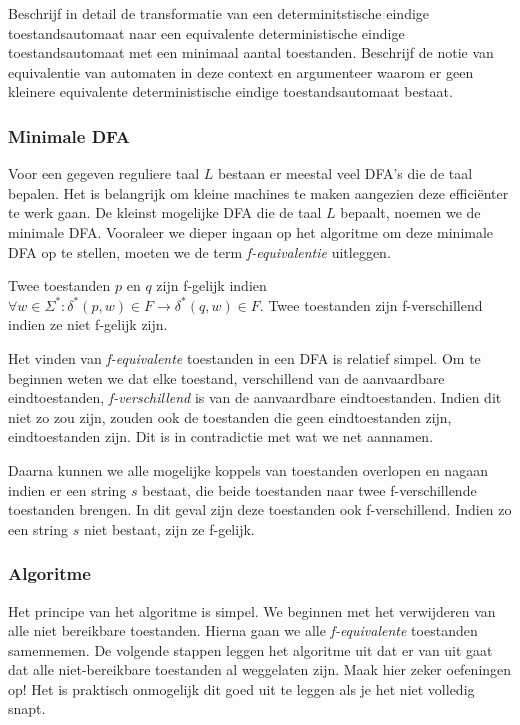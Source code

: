 \begin{question}
Beschrijf in detail de transformatie van een determinitstische eindige toestandsautomaat naar een equivalente deterministische eindige toestandsautomaat met een minimaal aantal toestanden. Beschrijf de notie van equivalentie van automaten in deze context en argumenteer waarom er geen kleinere equivalente deterministische eindige toestandsautomaat bestaat.
\end{question}

\subsubsection*{Minimale DFA}

Voor een gegeven reguliere taal $L$ bestaan er meestal veel DFA's die de taal bepalen. Het is belangrijk om kleine machines te maken aangezien deze effici\"enter te werk gaan. De kleinst mogelijke DFA die de taal $L$ bepaalt, noemen we de minimale DFA. Vooraleer we dieper ingaan op het algoritme om deze minimale DFA op te stellen, moeten we de term \textit{f-equivalentie} uitleggen.

\begin{theorem}[f-equivalentie]
	Twee toestanden $p$ en $q$ zijn f-gelijk indien $\forall w \in \Sigma^*:\delta^*(p,w) \in F \rightarrow \delta^*(q,w) \in F$. Twee toestanden zijn f-verschillend indien ze niet f-gelijk zijn.
\end{theorem}

Het vinden van \textit{f-equivalente} toestanden in een DFA is relatief simpel. Om te beginnen weten we dat elke toestand, verschillend van de aanvaardbare eindtoestanden, \textit{f-verschillend} is van de aanvaardbare eindtoestanden. Indien dit niet zo zou zijn, zouden ook de toestanden die geen eindtoestanden zijn, eindtoestanden zijn. Dit is in contradictie met wat we net aannamen.

Daarna kunnen we alle mogelijke koppels van toestanden overlopen en nagaan indien er een string $s$ bestaat, die beide toestanden naar twee f-verschillende toestanden brengen. In dit geval zijn deze toestanden ook f-verschillend. Indien zo een string $s$ niet bestaat, zijn ze f-gelijk.

\subsubsection*{Algoritme}

Het principe van het algoritme is simpel. We beginnen met het verwijderen van alle niet bereikbare toestanden. Hierna gaan we alle \textit{f-equivalente} toestanden samennemen. De volgende stappen leggen het algoritme uit dat er van uit gaat dat alle niet-bereikbare toestanden al weggelaten zijn. Maak hier zeker oefeningen op! Het is praktisch onmogelijk dit goed uit te leggen als je het niet volledig snapt.

